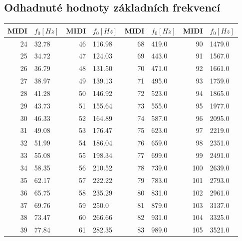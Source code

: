 \documentclass[a4paper, 12pt]{article}
\begin{document}
	\subsection{Odhadnuté hodnoty základních frekvencí}
	\begin{table}[H]
		\begin{tabularx}{\textwidth}{r|Xr|Xr|Xr|X}
		MIDI & $f_0 [Hz]$ &        MIDI & $f_0 [Hz]$  &        MIDI & $f_0 [Hz]$ & MIDI & $f_0 [Hz]$ \\ \hline
		24 & 32.78        &        46 & 116.98        &        68 & 419.0 &        90 & 1479.0 \\
		25 & 34.72        &        47 & 124.03        &        69 & 443.0 &        91 & 1567.0 \\
		26 & 36.79        &        48 & 131.50        &        70 & 471.0 &        92 & 1661.0 \\
		27 & 38.97        &        49 & 139.13        &        71 & 495.0 &        93 & 1759.0 \\
		28 & 41.28        &        50 & 146.92        &        72 & 523.0 &        94 & 1865.0 \\
		29 & 43.73        &        51 & 155.64        &        73 & 555.0 &        95 & 1977.0 \\
		30 & 46.33        &        52 & 164.89        &        74 & 587.0 &        96 & 2095.0 \\
		31 & 49.08        &        53 & 176.47        &        75 & 623.0 &        97 & 2219.0 \\
		32 & 51.99        &        54 & 186.04        &        76 & 659.0 &        98 & 2351.0 \\
		33 & 55.08        &        55 & 198.34        &        77 & 699.0 &        99 & 2491.0 \\
		34 & 58.35        &        56 & 210.52        &        78 & 739.0 &        100 & 2639.0 \\
		35 & 62.17        &        57 & 222.22        &        79 & 783.0 &        101 & 2793.0 \\
		36 & 65.75        &        58 & 235.29        &        80 & 831.0 &        102 & 2961.0 \\
		37 & 69.76        &        59 & 250.0         &        81 & 879.0 &        103 & 3137.0 \\
		38 & 73.47        &        60 & 266.66        &        82 & 931.0 &        104 & 3325.0 \\
		39 & 77.84        &        61 & 282.35        &        83 & 989.0 &        105 & 3521.0 \\

\end{tabularx}
\end{table}
\end{document}

